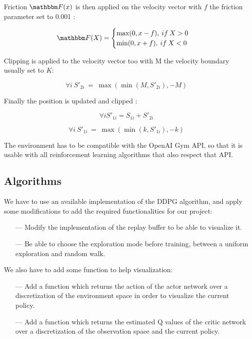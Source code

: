 \documentclass{article}
\begin{document}
\begin{itemize}
    Friction $\mathbbm F(x)$ is then applied on the velocity vector with $f$ the friction parameter set to 0.001 :
    
    \begin{equation}
        \mathbbm F(X) =
            \begin{cases}
                \max (0, x - f),\:if\: X > 0\\
                \min (0, x + f),\:if\: X < 0\\
            \end{cases}
    \end{equation}
    
    Clipping is applied to the velocity vector too with M the velocity boundary usually set to $K$:
    
    $$\forall i \: S'_{2i} \: = \: \max (\min (M, S'_{2i}), -M)$$
    
    Finally the position is updated and clipped :
    
    $$\forall i S'_{1i} = S_{1i} + S'_{2i}$$
    
    $$\forall i \: S'_{1i} \: = \: \max (\min (k, S'_{1i}), -k)$$
    
    
\end{itemize}

The environment has to be compatible with the OpenAI Gym API, so that it is usable with all reinforcement learning algorithms that also respect that API.

\subsection{Algorithms}

We have to use an available implementation of the DDPG algorithm, and apply some modifications to add the required functionalities for our project:
\begin{itemize}
    \item[---] Modify the implementation of the replay buffer to be able to visualize it.
    \item[---] Be able to choose the exploration mode before training, between a uniform exploration and random walk.
\end{itemize}

We also have to add some function to help visualization:
\begin{itemize}
    \item[---] Add a function which returns the action of the actor network over a discretization of the environment space in order to visualize the current policy.
    \item[---] Add a function which returns the estimated Q values of the critic network over a discretization of the observation space and the current policy.
\end{itemize}
\end{document}
